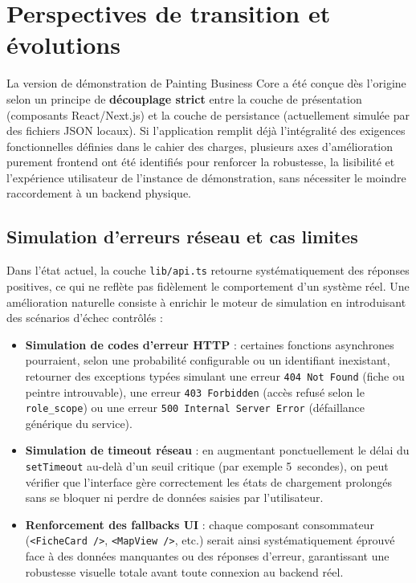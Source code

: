 \documentclass[12pt,a4paper]{report}
\begin{document}
\section{Perspectives de transition et évolutions}

La version de démonstration de Painting Business Core a été conçue dès l'origine selon un principe de \textbf{découplage strict} entre la couche de présentation (composants React/Next.js) et la couche de persistance (actuellement simulée par des fichiers JSON locaux). Si l'application remplit déjà l'intégralité des exigences fonctionnelles définies dans le cahier des charges, plusieurs axes d'amélioration purement frontend ont été identifiés pour renforcer la robustesse, la lisibilité et l'expérience utilisateur de l'instance de démonstration, sans nécessiter le moindre raccordement à un backend physique.

\subsection{Simulation d'erreurs réseau et cas limites}

Dans l'état actuel, la couche \texttt{lib/api.ts} retourne systématiquement des réponses positives, ce qui ne reflète pas fidèlement le comportement d'un système réel. Une amélioration naturelle consiste à enrichir le moteur de simulation en introduisant des scénarios d'échec contrôlés :

\begin{itemize}
    \item \textbf{Simulation de codes d'erreur HTTP} : certaines fonctions asynchrones pourraient, selon une probabilité configurable ou un identifiant inexistant, retourner des exceptions typées simulant une erreur \texttt{404 Not Found} (fiche ou peintre introuvable), une erreur \texttt{403 Forbidden} (accès refusé selon le \texttt{role\_scope}) ou une erreur \texttt{500 Internal Server Error} (défaillance générique du service).
    
    \item \textbf{Simulation de timeout réseau} : en augmentant ponctuellement le délai du \texttt{setTimeout} au-delà d'un seuil critique (par exemple 5~secondes), on peut vérifier que l'interface gère correctement les états de chargement prolongés sans se bloquer ni perdre de données saisies par l'utilisateur.
    
    \item \textbf{Renforcement des fallbacks UI} : chaque composant consommateur (\texttt{<FicheCard />}, \texttt{<MapView />}, etc.) serait ainsi systématiquement éprouvé face à des données manquantes ou des réponses d'erreur, garantissant une robustesse visuelle totale avant toute connexion au backend réel.
\end{itemize}
\end{document}

